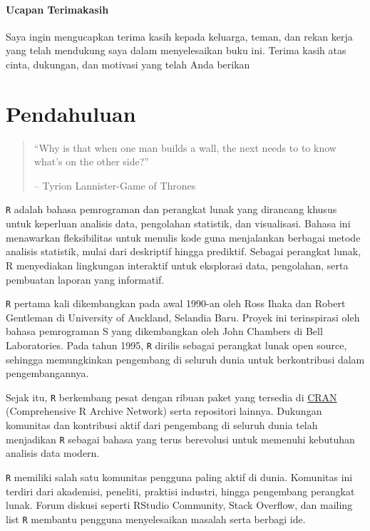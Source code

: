 \documentclass[
  oneside]{book}
\begin{document}
\subsubsection*{Ucapan Terimakasih}\label{ucapan-terimakasih}

Saya ingin mengucapkan terima kasih kepada keluarga, teman, dan rekan kerja yang telah mendukung saya dalam menyelesaikan buku ini. Terima kasih atas cinta, dukungan, dan motivasi yang telah Anda berikan

\chapter{Pendahuluan}\label{pd}

\begin{quote}
``Why is that when one man builds a wall, the next needs to to know
what's on the other side?''

-- Tyrion Lannister-Game of Thrones
\end{quote}

\texttt{R} adalah bahasa pemrograman dan perangkat lunak yang
dirancang khusus untuk keperluan analisis data, pengolahan statistik,
dan visualisasi. Bahasa ini menawarkan fleksibilitas untuk menulis kode
guna menjalankan berbagai metode analisis statistik, mulai dari
deskriptif hingga prediktif. Sebagai perangkat lunak, R menyediakan
lingkungan interaktif untuk eksplorasi data, pengolahan, serta pembuatan
laporan yang informatif.

\texttt{R} pertama kali dikembangkan pada awal 1990-an oleh Ross
Ihaka dan Robert Gentleman di University of Auckland, Selandia Baru.
Proyek ini terinspirasi oleh bahasa pemrograman S yang dikembangkan oleh
John Chambers di Bell Laboratories. Pada tahun 1995, \texttt{R}
dirilis sebagai perangkat lunak open source, sehingga memungkinkan
pengembang di seluruh dunia untuk berkontribusi dalam pengembangannya.

Sejak itu, \texttt{R} berkembang pesat dengan ribuan paket yang
tersedia di \href{https://cran.r-project.org/}{CRAN} (Comprehensive R Archive
Network) serta repositori lainnya. Dukungan komunitas dan kontribusi
aktif dari pengembang di seluruh dunia telah menjadikan \texttt{R}
sebagai bahasa yang terus berevolusi untuk memenuhi kebutuhan analisis
data modern.

\texttt{R} memiliki salah satu komunitas pengguna paling aktif di
dunia. Komunitas ini terdiri dari akademisi, peneliti, praktisi
industri, hingga pengembang perangkat lunak. Forum diskusi seperti
RStudio Community, Stack Overflow, dan mailing list \texttt{R}
membantu pengguna menyelesaikan masalah serta berbagi ide.
\end{document}
